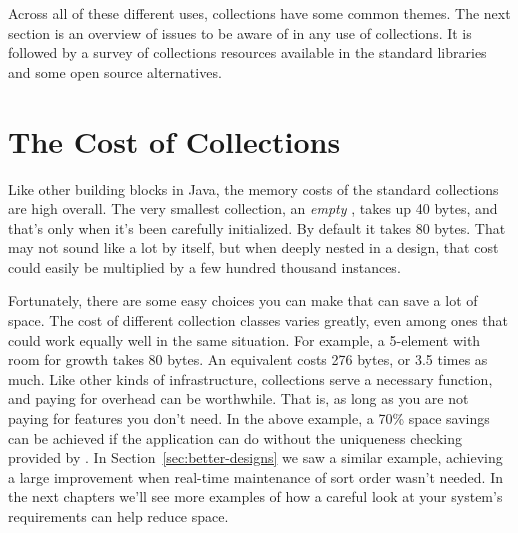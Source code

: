 Across all of these different uses, collections have some common themes.
The next section is an overview of issues to
be aware of in any use of collections. It is followed by a
survey of collections resources available in the
standard libraries and some open source alternatives.

\section{The Cost of Collections}
\label{sec:designing-with-collections}

Like other building blocks in Java, the memory costs
of the standard collections are high overall. 
The very smallest collection, an \emph{empty}
, takes up 40 bytes, and that's only when it's been carefully
initialized. By default it takes 80 bytes. That may not sound like a lot by
itself, but when deeply nested in a design, that cost could easily be multiplied
by a few hundred thousand instances.  







Fortunately, there are some easy choices you can make that
can save a lot of space. The cost of different
collection classes varies greatly, even among ones that could work equally well
in the same situation. For example, a 5-element  with room for growth takes 80 bytes. An equivalent  costs 276 bytes,
or 3.5 times as much. Like other kinds of infrastructure, collections serve a
necessary function, and paying for overhead can be worthwhile. That is, as long as you are not
paying for features you don't need. In the above example, a
70\% space savings can be achieved if the application can do without the
uniqueness checking provided by .  In
Section~\ref{sec:better-designs} we saw a similar example, achieving a large
improvement when real-time
maintenance of sort order wasn't needed. In the next chapters we'll see more
examples of how a careful look at your system's
requirements can help reduce space.

